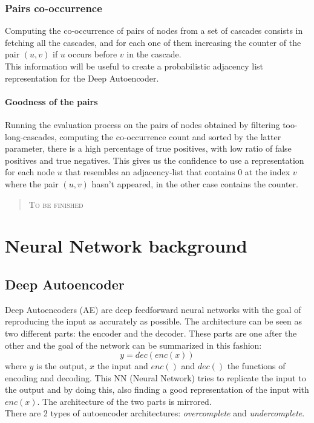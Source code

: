 \documentclass{article}
\begin{document}
			\subsubsection{Pairs co-occurrence}
			Computing the co-occurrence of pairs of nodes from a set of cascades consists in fetching all the cascades, and for each one of them increasing the counter of the pair $(u,v)$ if $u$ occurs before $v$ in the cascade.\\
			This information will be useful to create a probabilistic adjacency list representation for the Deep Autoencoder.
			\paragraph{Goodness of the pairs}
			Running the evaluation process on the pairs of nodes obtained by filtering too-long-cascades, computing the co-occurrence count and sorted by the latter parameter, there is a high percentage of true positives, with low ratio of false positives and true negatives. This gives us the confidence to use a representation for each node $u$ that resembles an adjacency-list that contains 0 at the index $v$ where the pair $(u,v)$ hasn't appeared, in the other case contains the counter.\\
			\begin{quote}
				\centering
				\textsc{To be finished}\\
			\end{quote}
			\newpage
			
		\section{Neural Network background}
			\subsection{Deep Autoencoder}
			Deep Autoencoders (AE) are deep feedforward neural networks with the goal of reproducing the input as accurately as possible. The architecture can be seen as two different parts: the encoder and the decoder. These parts are one after the other and the goal of the network can be summarized in this fashion:
			$$y=dec(enc(x))$$
			where $y$ is the output, $x$ the input and $enc()$ and $dec()$ the functions of encoding and decoding. This NN (Neural Network) tries to replicate the input to the output and by doing this, also finding a good representation of the input with $enc(x)$. The architecture of the two parts is mirrored.\\
			There are 2 types of autoencoder architectures: \textit{overcomplete} and \textit{undercomplete}.
\end{document}
